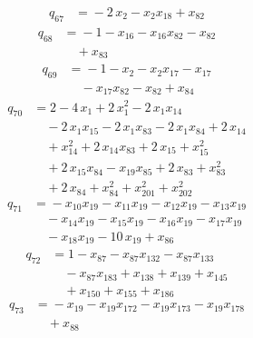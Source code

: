 \begin{align*}
q_{67} &={}-2\,x_{2} -x_{2}x_{18} +x_{82}
\end{align*}
\begin{align*}
q_{68} &={}-1 -x_{16} -x_{16}x_{82} -x_{82}\\
&\quad +x_{83}
\end{align*}
\begin{align*}
q_{69} &={}-1 -x_{2} -x_{2}x_{17} -x_{17}\\
&\quad -x_{17}x_{82} -x_{82} +x_{84}
\end{align*}
\begin{align*}
q_{70} &={}2 -4\,x_{1} +2\,x_{1}^{2} -2\,x_{1}x_{14}\\
&\quad -2\,x_{1}x_{15} -2\,x_{1}x_{83} -2\,x_{1}x_{84} +2\,x_{14}\\
&\quad +x_{14}^{2} +2\,x_{14}x_{83} +2\,x_{15} +x_{15}^{2}\\
&\quad +2\,x_{15}x_{84} -x_{19}x_{85} +2\,x_{83} +x_{83}^{2}\\
&\quad +2\,x_{84} +x_{84}^{2} +x_{201}^{2} +x_{202}^{2}
\end{align*}
\begin{align*}
q_{71} &={}-x_{10}x_{19} -x_{11}x_{19} -x_{12}x_{19} -x_{13}x_{19}\\
&\quad -x_{14}x_{19} -x_{15}x_{19} -x_{16}x_{19} -x_{17}x_{19}\\
&\quad -x_{18}x_{19} -10\,x_{19} +x_{86}
\end{align*}
\begin{align*}
q_{72} &={}1 -x_{87} -x_{87}x_{132} -x_{87}x_{133}\\
&\quad -x_{87}x_{183} +x_{138} +x_{139} +x_{145}\\
&\quad +x_{150} +x_{155} +x_{186}
\end{align*}
\begin{align*}
q_{73} &={}-x_{19} -x_{19}x_{172} -x_{19}x_{173} -x_{19}x_{178}\\
&\quad +x_{88}
\end{align*}
